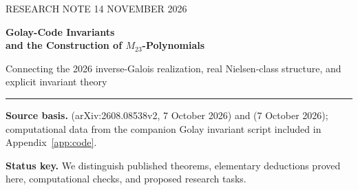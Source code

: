 \documentclass[11pt,letterpaper]{article}
\theoremstyle{definition}
\newcommand{\QQ}{\mathbb{Q}}
\begin{document}
\begin{titlepage}
\vspace*{0.85in}
{\sffamily\color{accent}\Large RESEARCH NOTE \hfill 14 NOVEMBER 2026}\par
\vspace{0.55in}
{\fontsize{27}{34}\selectfont\bfseries Golay-Code Invariants\\[0.04em] and the Construction of \(M_{23}\)-Polynomials}\par
\vspace{0.3in}
{\Large\color{muted}Connecting the 2026 inverse-Galois realization, real Nielsen-class structure, and explicit invariant theory}\par
\vspace{0.55in}
\noindent\color{accent}\rule{\linewidth}{1.4pt}\color{black}
\vspace{0.36in}
\begin{abstract}\noindent
The perfect binary Golay code \([23,12,7]\) has automorphism group \(M_{23}\), the last sporadic simple group realized as a Galois group over \(\QQ\) in the 2026 work of Huang, Jackson, Lee, Poonen, Pries and Zhang. A complementary real-structure analysis by Janik isolates three complex-conjugation-fixed covers in the seven-element Nielsen class \((2,23A,23B)\). This note synthesizes those results, incorporates the six-plus-one arithmetic orbit decomposition proved in the first paper, and builds two concrete invariants from the Steiner system \(S(4,7,23)\): a degree-five polynomial with 5,313 monomials and a degree-seven heptad polynomial with 253 monomials. The gradient of the latter supplies a 23-component \(M_{23}\)-equivariant covariant and hence a rigorous family of code-derived degree-23 polynomials over \(\QQ(t,u)\). We distinguish such new defining equations from genuinely new regular \(M_{23}\)-covers, establish an irreducible degree-253 heptad resolvent, and formulate a computational program for invariant-guided Hurwitz-space constructions. No new independent regular cover is claimed.
\end{abstract}
\vfill
\noindent\textbf{Source basis.} \cite{HJLPPZ26} (arXiv:2608.08538v2, 7 October 2026) and \cite{Janik26} (7 October 2026); computational data from the companion Golay invariant script included in Appendix~\ref{app:code}.\par
\vspace{0.2in}
\noindent\textbf{Status key.} We distinguish published theorems, elementary deductions proved here, computational checks, and proposed research tasks.\par
\end{titlepage}
\end{document}
